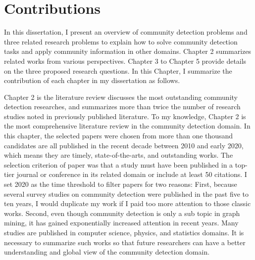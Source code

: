 \section{Contributions}
In this dissertation, I present an overview of community detection problems and three related research problems to explain how to solve community detection tasks and apply community information in other domains. Chapter 2 summarizes related works from various perspectives. Chapter 3 to Chapter 5 provide details on the three proposed research questions. In this Chapter, I  summarize the contribution of each chapter in my dissertation as follows.

Chapter 2 is the literature review discusses the most outstanding community detection researches, and summarizes more than twice the number of research studies noted in previously published literature. To my knowledge, Chapter 2 is the most comprehensive literature review in the community detection domain.  In this chapter, the selected papers were chosen from more than one thousand candidates are all published in the recent decade between 2010 and early 2020, which means they are timely, state-of-the-arts, and outstanding works. The selection criterion of paper was that a study must have been published in a top-tier journal or conference in its related domain or include at least 50 citations. I set 2020 as the time threshold to filter papers for two reasons: First, because several survey studies on community detection were published in the past five to ten years, I would duplicate my work if I paid too more attention to those classic works. Second, even though community detection is only a sub topic in graph mining, it has gained  exponentially increased attention in recent years. Many studies are published in computer science, physics, and statistics domains. It is necessary to summarize such works so that future researchers can have a better understanding and global view of the community detection domain. 

